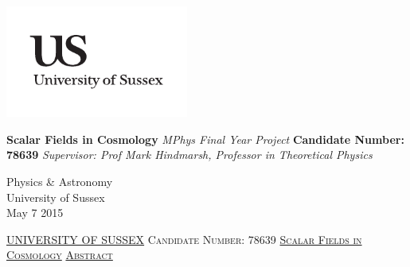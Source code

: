\documentclass[a4paper,12pt,twoside]{report}
\newcommand{\linespacing}{1.5}
\renewcommand{\baselinestretch}{\linespacing}
\begin{document}




\thispagestyle{empty}
\begin{flushright}
\includegraphics[width=6cm]{uslogo}
\end{flushright}	
\vskip40mm
\begin{center}
\huge\textbf{Scalar Fields in Cosmology}
\vskip2mm
\LARGE\textit{MPhys Final Year Project}
\vskip5mm
\Large\textbf{Candidate Number: 78639}
\vskip5mm
\Large\textit{Supervisor: Prof Mark Hindmarsh, Professor in Theoretical Physics}
\normalsize
\end{center}
\vfill
\begin{flushleft}
\large
Physics \& Astronomy \\
University of Sussex	\\
May 7 2015
\end{flushleft}		


\thispagestyle{empty}
\newpage
\null\vskip10mm
\begin{center}
\large
\underline{UNIVERSITY OF SUSSEX}
\vskip15mm
\textsc{Candidate Number: 78639}
\vskip15mm
\underline{\textsc{Scalar Fields in Cosmology}}
\vskip15mm
\underline{\textsc{Abstract}}
\vskip15mm
\end{center}
\renewcommand{\baselinestretch}{1.0}
\small\normalsize
\end{document}
